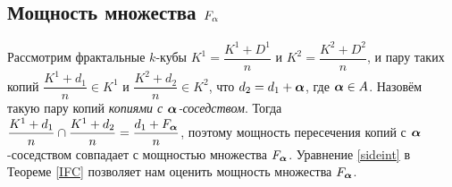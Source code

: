 %
%
%
%
%
%
%

\subsection{Мощность множества $F_\alpha$}

Рассмотрим фрактальные $k$-кубы $K^1=\dfrac{K^1+D^1}{n}$ и  $K^2=\dfrac{K^2+D^2}{n}$, и пару таких копий $\dfrac{K^1+d_1}{n}\in K^1$ и $\dfrac{K^2+d_2}{n}\in K^2$, что $d_2=d_1+{\bm{\alpha}}$, где ${\bm{\alpha}}\in A$.
Назовём такую пару копий {\em копиями с ${\bm{\alpha}}$-соседством}.
Тогда $\dfrac{K^1+d_1}{n}\cap\dfrac{K^1+d_2}{n}=\dfrac{d_1+F_{\bm{\alpha}}}{n}$, поэтому мощность пересечения копий с ${\bm{\alpha}}$-соседством совпадает с мощностью множества $F_{\bm{\alpha}}$.
Уравнение \eqref{sideint} в Теореме \ref{IFC} позволяет нам оценить мощность множества $F_{\bm{\alpha}}$.

